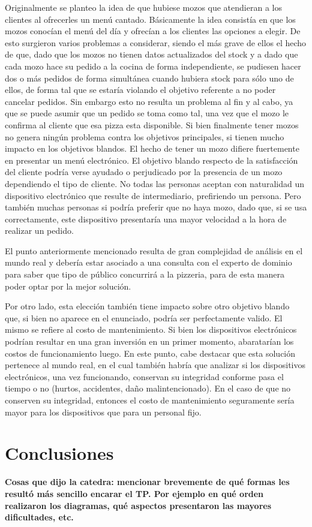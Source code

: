\documentclass[a4paper,10pt]{article}
\begin{document}
Originalmente se planteo la idea de que hubiese mozos que atendieran a los clientes al ofrecerles un menú cantado.
 Básicamente la idea consistía en que los mozos conocían el menú del día y ofrecían a los clientes las opciones a elegir.
 De esto surgieron varios problemas a considerar, siendo el más grave de ellos el hecho de que, dado que los mozos no tienen datos
 actualizados del stock y a dado que cada mozo hace su pedido a la cocina de forma independiente, se pudiesen hacer dos o más pedidos de
 forma simultánea cuando hubiera stock para sólo uno de ellos, de forma tal que se estaría violando el objetivo referente a no poder 
cancelar pedidos. Sin embargo esto no resulta un problema al fin y al cabo, ya que se puede asumir que un pedido se toma como tal, una vez
que el mozo le confirma al cliente que esa pizza esta disponible. Si bien finalmente tener mozos no genera ning\'un problema contra los objetivos
principales, si tienen mucho impacto en los objetivos blandos. El hecho de tener un mozo difiere fuertemente en presentar un men\'u electr\'onico.
El objetivo blando respecto de la satisfacci\'on del cliente podr\'ia verse ayudado o perjudicado por la presencia de un mozo dependiendo el
tipo de cliente. No todas las personas aceptan con naturalidad un dispositivo electr\'onico que resulte de intermediario, prefiriendo un persona. Pero
tambi\'en muchas personas si podr\'ia preferir que no haya mozo, dado que, si se usa correctamente, este dispositivo presentar\'ia una mayor velocidad
a la hora de realizar un pedido.

El punto anteriormente mencionado resulta de gran complejidad de an\'alisis en el mundo real y deber\'ia estar asociado a una consulta con el
experto de dominio para saber que tipo de p\'ublico concurrir\'a a la pizzeria, para de esta manera poder optar por la mejor soluci\'on.

Por otro lado, esta elecci\'on tambi\'en tiene impacto sobre otro objetivo blando que, si bien no aparece en el enunciado, podr\'ia ser perfectamente valido.
El mismo se refiere al costo de mantenimiento. Si bien los dispositivos electr\'onicos podr\'ian resultar en una gran inversi\'on en un primer momento,
abaratar\'ian los costos de funcionamiento luego. En este punto, cabe destacar que esta soluci\'on pertenece al mundo real, en el cual tambi\'en
habr\'ia que analizar si los dispositivos electr\'onicos, una vez funcionando, conservan su integridad conforme pasa el tiempo o no (hurtos, accidentes, da\~{n}o malintencionado).
En el caso de que no conserven su integridad, entonces el costo de mantenimiento seguramente ser\'ia mayor para los dispositivos que para un personal fijo.


 

\newpage
\section*{Conclusiones}

\textbf{Cosas que dijo la catedra: mencionar brevemente de qué formas les resultó más sencillo encarar el TP. Por ejemplo en qué orden realizaron los diagramas, qué aspectos presentaron las mayores dificultades, etc.}
\end{document}
